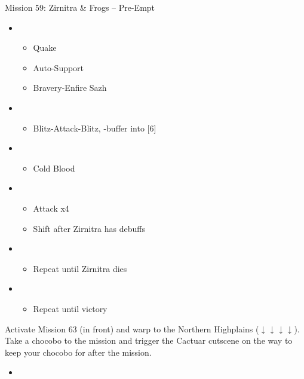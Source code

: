 \begin{battle}{Mission 59: Zirnitra \& Frogs -- Pre-Empt}
	\begin{itemize}
		\item \fifth
			\begin{itemize}
				\item Quake
				\item Auto-Support
				\item Bravery-Enfire Sazh
			\end{itemize}
		\item \third
			\begin{itemize}
				\item Blitz-Attack-Blitz, \rav-buffer into [6]
			\end{itemize}
		\item \sixth
			\begin{itemize}
				\item Cold Blood
			\end{itemize}
		\item \second
			\begin{itemize}
				\item Attack x4
				\item Shift after Zirnitra has debuffs
			\end{itemize}
		\item \third
			\begin{itemize}
				\item Repeat until Zirnitra dies
			\end{itemize}
		\item \first
			\begin{itemize}
				\item Repeat until victory
			\end{itemize}
	\end{itemize}
\end{battle}

Activate Mission 63 (in front) and warp to the Northern Highplains ($\downarrow\downarrow\downarrow\downarrow$).
Take a chocobo to the mission and trigger the Cactuar cutscene on the way to keep your chocobo for after the mission.

\begin{menu}
	\begin{itemize}
	\paradigm
		\begin{itemize}
			\item {}%
				{\paradigmline{\com}{\com}{\com}}%
				{\paradigmline{\com}{\com}{\sab}}%
				{\paradigmline{\com}{(\rav)}{(\sab)}}%
				{\paradigmline[4]{\syn}{\rav}{\sab}}%
				{\paradigmline{(\com)}{(\rav)}{(\rav)}}%
				{\paradigmline{\rav}{\rav}{\sab}}%
		\end{itemize}
	\end{itemize}
\end{menu}

